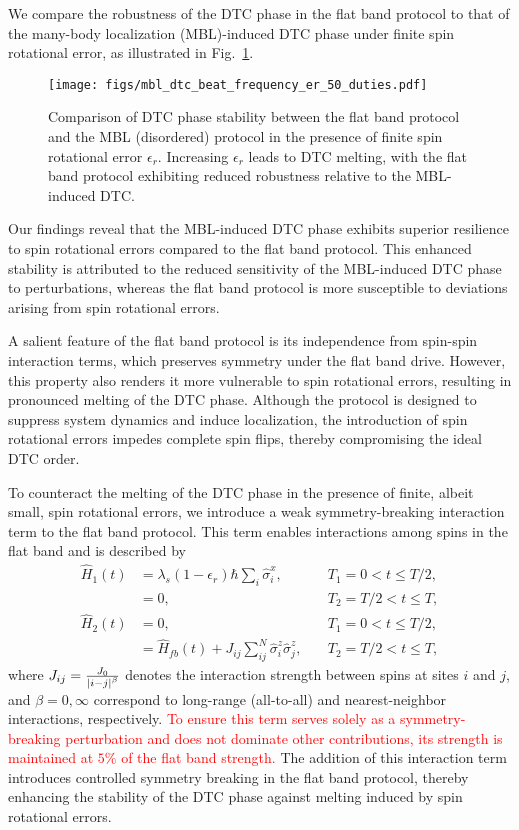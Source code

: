 \documentclass[a4paper,10pt]{article}
\newcommand{\red}[1]{\textcolor{red}{#1}}
\begin{document}
We compare the robustness of the DTC phase in the flat band protocol to that of the many-body localization (MBL)-induced DTC phase under finite spin rotational error, as illustrated in Fig.~\ref{fig:mbl_dtc_comparison}.
\begin{figure}[h]
    \centering
    \texttt{[image: figs/mbl\_dtc\_beat\_frequency\_er\_50\_duties.pdf]}
    \caption{Comparison of DTC phase stability between the flat band protocol and the MBL (disordered) protocol in the presence of finite spin rotational error $\epsilon_r$. Increasing $\epsilon_r$ leads to DTC melting, with the flat band protocol exhibiting reduced robustness relative to the MBL-induced DTC.}
    \label{fig:mbl_dtc_comparison}
\end{figure}
Our findings reveal that the MBL-induced DTC phase exhibits superior resilience to spin rotational errors compared to the flat band protocol. This enhanced stability is attributed to the reduced sensitivity of the MBL-induced DTC phase to perturbations, whereas the flat band protocol is more susceptible to deviations arising from spin rotational errors.

A salient feature of the flat band protocol is its independence from spin-spin interaction terms, which preserves symmetry under the flat band drive. However, this property also renders it more vulnerable to spin rotational errors, resulting in pronounced melting of the DTC phase. Although the protocol is designed to suppress system dynamics and induce localization, the introduction of spin rotational errors impedes complete spin flips, thereby compromising the ideal DTC order.

To counteract the melting of the DTC phase in the presence of finite, albeit small, spin rotational errors, we introduce a weak symmetry-breaking interaction term to the flat band protocol. This term enables interactions among spins in the flat band and is described by
\begin{align}
    \hat{H}_1(t) &= \lambda_s (1-\epsilon_r) \hbar \sum_i \hat{\sigma}^x_i, &\quad T_1 = 0<t \le T/2, \\
            &= 0, &\quad T_2 = T/2<t \le T, \\
    \hat{H}_2(t) &= 0, &\quad T_1 = 0<t \le T/2, \\
    \label{fb_interaction}
    &= \hat{H}_{fb}(t) + J_{ij} \sum_{ij}^N \hat{\sigma}_i^z \hat{\sigma}_{j}^z, &\quad T_2  = T/2<t \le T,
\end{align}
where $J_{ij} = \frac{J_0}{\abs{i-j}^\beta}$ denotes the interaction strength between spins at sites $i$ and $j$, and $\beta = 0, \infty$ correspond to long-range (all-to-all) and nearest-neighbor interactions, respectively. \red{To ensure this term serves solely as a symmetry-breaking perturbation and does not dominate other contributions, its strength is maintained at $5\%$ of the flat band strength.} The addition of this interaction term introduces controlled symmetry breaking in the flat band protocol, thereby enhancing the stability of the DTC phase against melting induced by spin rotational errors.
\end{document}
